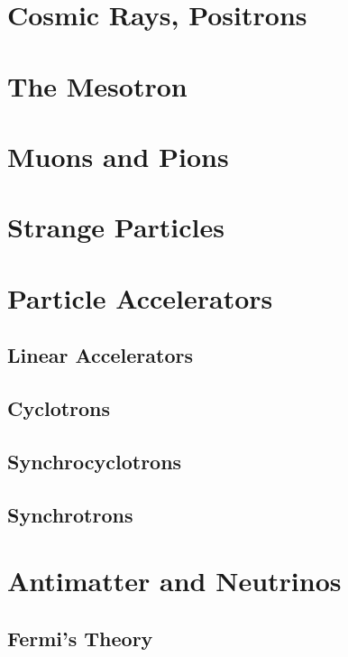 \documentclass[../qm.tex]{subfiles}
\begin{document}
\section{Cosmic Rays, Positrons}
\section{The Mesotron}
\section{Muons and Pions}
\section{Strange Particles}
\section{Particle Accelerators}
\subsection{Linear Accelerators}
\subsection{Cyclotrons}
\subsection{Synchrocyclotrons}
\subsection{Synchrotrons}
\section{Antimatter and Neutrinos}
\subsection{Fermi's Theory}
\end{document}
